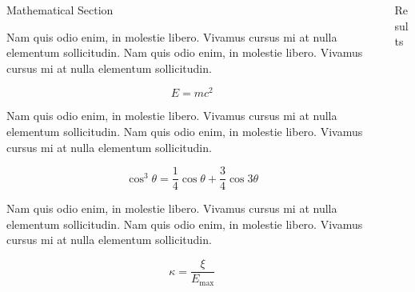 \documentclass[final]{beamer}
\newlength{\onecolwid}
\newlength{\twocolwid}
\begin{document}
\begin{frame}[t]
\begin{columns}[t]
\begin{column}{\twocolwid}
\begin{columns}[t,totalwidth=\twocolwid]
\begin{column}{\onecolwid}
					\begin{block}{Mathematical Section}

						Nam quis odio enim, in molestie libero. Vivamus cursus mi at nulla elementum sollicitudin. Nam quis odio enim, in molestie libero. Vivamus cursus mi at nulla elementum sollicitudin.

						\begin{equation}
							E = mc^{2}
							\label{eqn:Einstein}
						\end{equation}

						Nam quis odio enim, in molestie libero. Vivamus cursus mi at nulla elementum sollicitudin. Nam quis odio enim, in molestie libero. Vivamus cursus mi at nulla elementum sollicitudin.

						\begin{equation}
							\cos^3 \theta =\frac{1}{4}\cos\theta+\frac{3}{4}\cos 3\theta
							\label{eq:refname}
						\end{equation}

						Nam quis odio enim, in molestie libero. Vivamus cursus mi at nulla elementum sollicitudin. Nam quis odio enim, in molestie libero. Vivamus cursus mi at nulla elementum sollicitudin.

						\begin{equation}
							\kappa =\frac{\xi}{E_{\mathrm{max}}} %
						\end{equation}

					\end{block}


				\end{column} %

				\begin{column}{\onecolwid} %


					\begin{block}{Results}


\end{block}
\end{column}
\end{columns}
\end{column}
\end{columns}
\end{frame}
\end{document}
